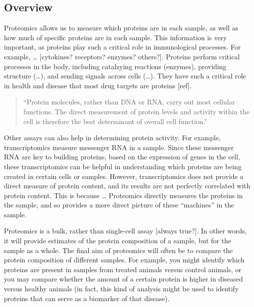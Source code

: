 \documentclass[
]{book}
\begin{document}
\hypertarget{overview-3}{%
\subsection{Overview}\label{overview-3}}

Proteomics allows us to measure which proteins are in each sample, as well
as how much of specific proteins are in each sample. This information is
very important, as proteins play such a critical role in immunological
processes. For example, \ldots{} {[}cytokines? receptors? enzymes? others?{]}.
Proteins perform critical processes in the body, including catalzying
reactions (enzymes), providing structure (\ldots), and sending signals across
cells (\ldots). They have such a critical role in health and disease that
most drug targets are proteins {[}ref{]}.

\begin{quote}
``Protein molecules, rather than DNA or RNA, carry out most cellular functions.
The direct measurement of protein levels and activity within the cell is
therefore the best determinant of overall cell function.''
\citep{lakhani2001microarray}
\end{quote}

Other assays can also help in determining protein activity. For example,
transcriptomics measure messenger RNA in a sample. Since these messenger
RNA are key to building proteins, based on the expression of genes in the
cell, these transcriptomics can be helpful in understanding which proteins
are being created in certain cells or samples. However, transcriptomics
does not provide a direct measure of protein content, and its results
are not perfectly correlated with protein content. This is because \ldots{}
Proteomics directly measures the proteins in the sample, and so provides
a more direct picture of these ``machines'' in the sample.

Proteomics is a bulk, rather than single-cell assay {[}always true?{]}. In other
words, it will provide estimates of the protein composition of a sample, but for
the sample as a whole. The final aim of proteomics will often be to compare
the protein composition of different samples. For example, you might
identify which proteins are present in samples from treated animals versus
control animals, or you may compare whether the amount of a certain
protein is higher in diseased versus healthy animals (in fact, this kind
of analysis might be used to identify proteins that can serve as a
biomarker of that disease).
\end{document}
